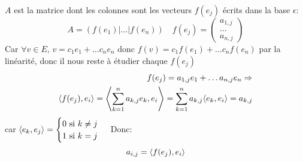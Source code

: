 \begin{preuve}
   $A$ est la matrice dont les colonnes sont les vecteurs  $f(e_j)$ écrits dans la base $\epsilon$:
    \[
        A = (f(e_1) | \ldots | f(e_n))\quad f(e_j) = \begin{pmatrix} a_{1,j}\\ \ldots\\ a_{n, j} \end{pmatrix} 
   \] 
   Car $\forall v \in E, \, v = c_1e_1 + \ldots c_ne_n$ donc $f(v) = c_1f(e_1) + \ldots c_nf(e_n)$ par la linéarité, donc il nous reste à étudier chaque $f(e_j)$
   \begin{align*}
       f(e_j) = a_{1, j}e_1 + \ldots a_{n, j}e_n \Rightarrow\\
       \langle f(e_j), e_i \rangle = \left\langle \sum_{k=1}^n a_{k,j} e_k, e_i \right\rangle = \sum_{k=1}^{n} a_{k,j}\langle e_k, e_i \rangle = a_{k, j}
   \end{align*}
   car $\langle e_k, e_j \rangle = \begin{cases}
       0 \text{ si } k \neq j\\
       1 \text{ si } k = j
   \end{cases}$
   Donc:
   \[
       a_{i, j} = \langle f(e_j), e_i \rangle
   \] 
\end{preuve}

